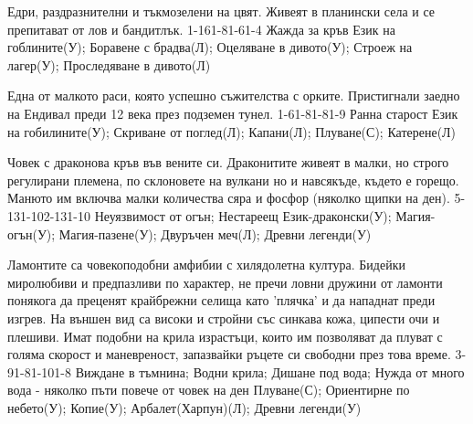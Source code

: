 \begin{multicols}{2}
{Едри, раздразнителни и тъкмозелени на цвят.
Живеят в планински села и се препитават от лов и бандитлък.}
{1-16}{1-8}{1-6}{1-4}
{
Жажда за кръв %
}
{
Език на гоблините(У);
Боравене с брадва(Л);
Оцеляване в дивото(У);
Строеж на лагер(У);
Проследяване в дивото(Л)
}

{Една от малкото раси, която успешно съжителства с орките.
Пристигнали заедно на Ендивал преди 12 века през подземен тунел.}
{1-6}{1-8}{1-8}{1-9}
{
Ранна старост
}
{
Език на гобилините(У);
Скриване от поглед(Л);
Капани(Л);
Плуване(С);
Катерене(Л)
}

{Човек с драконова кръв във вените си.
Драконитите живеят в малки, но строго регулирани племена, по склоновете на вулкани но и навсякъде, където е горещо.
Манюто им включва малки количества сяра и фосфор (няколко щипки на ден).}
{5-13}{1-10}{2-13}{1-10}
{
Неуязвимост от огън;
Нестареещ
}
{
Език-драконски(У);
Магия-огън(У);
Магия-пазене(У);
Двуръчен меч(Л);
Древни легенди(У)
}


{Ламонтите са човекоподобни амфибии с хилядолетна култура.
Бидейки миролюбиви и предпазливи по характер, не пречи ловни дружини от ламонти понякога да преценят крайбрежни селища като 'плячка' и да нападнат преди изгрев.
На външен вид са високи и стройни със синкава кожа, ципести очи и плешиви.
Имат подобни на крила израстъци, които им позволяват да плуват с голяма скорост и маневреност, запазвайки ръцете си свободни през това време.}
{3-9}{1-8}{1-10}{1-8}
{
Виждане в тъмнина;
Водни крила;
Дишане под вода;
Нужда от много вода - няколко пъти повече от човек на ден
}
{
Плуване(С);
Ориентирне по небето(У);
Копие(У);
Арбалет(Харпун)(Л);
Древни легенди(У)
}


\end{multicols}
